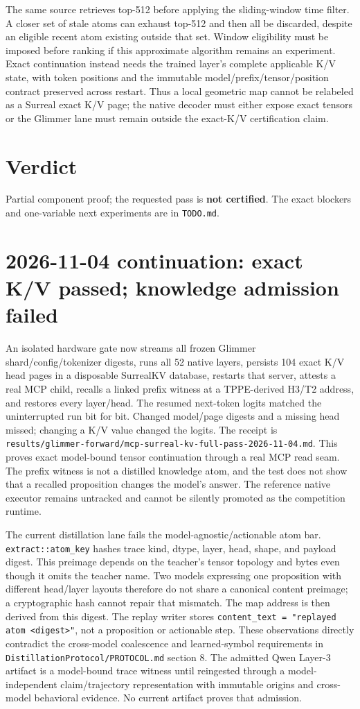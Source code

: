 \documentclass{article}
\begin{document}
The same source retrieves top-512 before applying the sliding-window time
filter. A closer set of stale atoms can exhaust top-512 and then all be
discarded, despite an eligible recent atom existing outside that set.
Window eligibility must be imposed before ranking if this approximate
algorithm remains an experiment. Exact continuation instead needs the
trained layer's complete applicable K/V state, with token positions and
the immutable model/prefix/tensor/position contract preserved across restart.
Thus a local geometric map cannot be relabeled as a Surreal exact K/V page;
the native decoder must either expose exact tensors or the Glimmer lane must
remain outside the exact-K/V certification claim.

\section*{Verdict}
Partial component proof; the requested pass is \textbf{not certified}.
The exact blockers and one-variable next experiments are in \texttt{TODO.md}.

\section*{2026-11-04 continuation: exact K/V passed; knowledge admission failed}
An isolated hardware gate now streams all frozen Glimmer shard/config/tokenizer
digests, runs all 52 native layers, persists 104 exact K/V head pages in a
disposable SurrealKV database, restarts that server, attests a real MCP child,
recalls a linked prefix witness at a TPPE-derived H3/T2 address, and restores
every layer/head. The resumed next-token logits matched the uninterrupted
run bit for bit. Changed model/page digests and a missing head missed; changing
a K/V value changed the logits. The receipt is
\texttt{results/glimmer-forward/mcp-surreal-kv-full-pass-2026-11-04.md}.
This proves exact model-bound tensor continuation through a real MCP read seam.
The prefix witness is not a distilled knowledge atom, and the test does not
show that a recalled proposition changes the model's answer. The reference
native executor remains untracked and cannot be silently promoted as the
competition runtime.

The current distillation lane fails the model-agnostic/actionable atom bar.
\texttt{extract::atom\_key} hashes trace kind, dtype, layer, head, shape,
and payload digest. This preimage depends on the teacher's tensor topology and
bytes even though it omits the teacher name. Two models expressing one
proposition with different head/layer layouts therefore do not share a
canonical content preimage; a cryptographic hash cannot repair that mismatch.
The map address is then derived from this digest. The replay writer stores
\texttt{content\_text = "replayed atom <digest>"}, not a proposition or
actionable step. These observations directly contradict the cross-model
coalescence and learned-symbol requirements in
\texttt{DistillationProtocol/PROTOCOL.md} section 8. The admitted Qwen
Layer-3 artifact is a model-bound trace witness until reingested through a
model-independent claim/trajectory representation with immutable origins and
cross-model behavioral evidence. No current artifact proves that admission.
\end{document}
